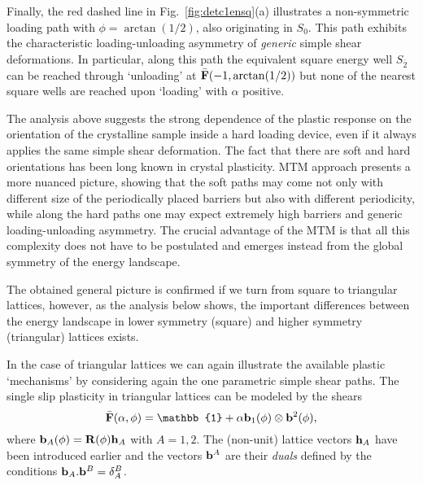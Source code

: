 \documentclass[CRPHYS,Unicode,manuscript]{cedram}
\begin{document}
Finally, the red dashed line in Fig.~\ref{fig:detc1ensq}(a)  illustrates  a non-symmetric loading path with  $\phi =\arctan(1/2)$, also originating in  $S_0$.  This path  exhibits the characteristic loading-unloading asymmetry  of \emph{generic} simple shear deformations.  In particular, along this path  the equivalent square energy well   $S_{\bar 2}$  can be  reached through  `unloading'  at $\bar{\bf F}(-1,\arctan(1/2))$ but none of the  nearest square wells are reached upon  `loading' with    $\alpha$   positive.  

The analysis above suggests the strong dependence of the plastic response  on the orientation of the crystalline sample inside a hard loading device,  even if it always applies the same simple shear deformation. The fact that there are soft and hard orientations has been long known in crystal plasticity. MTM approach presents a more  nuanced picture, showing that the soft paths may come not only with different size  of the periodically placed  barriers  but also with different periodicity, while along  the hard paths one may expect  extremely high barriers and generic loading-unloading asymmetry. The crucial advantage of the MTM  is that all this complexity does not have to be postulated and emerges instead from the global symmetry of the energy landscape.



 The obtained general picture is confirmed if we turn from square to triangular lattices, however, as  the analysis below shows, the important differences between the energy landscape in   lower symmetry (square) and higher symmetry (triangular) lattices exists.
 
 In the case of triangular lattices we can again illustrate the available plastic `mechanisms'   by  considering   again the one parametric  simple shear paths.  The single slip  plasticity in triangular  lattices can be modeled by the shears 
\begin{equation}
\label{pathshex}
\bar{\bf F}(\alpha,\phi) =\mathbb{1} +\alpha{\bf b}_1(\phi)\otimes{\bf b}^2(\phi),
\end{equation}
 where  ${\bf b}_A(\phi) = {\bf R(\phi)}{\bf h}_A$ with $A=1,2$.  The (non-unit) lattice vectors   $ {\bf h}_A$   have been introduced earlier and   the vectors  ${\bf b}^A$  are   their \emph{duals}  defined by the conditions ${\bf b}_A.{\bf b}^B =  \delta_A^B$.  
\end{document}
